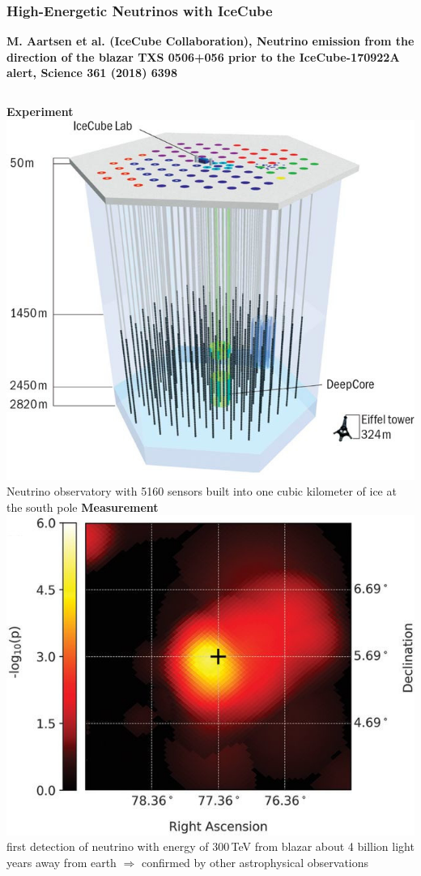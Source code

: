 \documentclass[10pt,t]{beamer}
\begin{document}
\begin{frame}
\frametitle{High-Energetic Neutrinos with IceCube}
\vspace*{-2.6\baselineskip}
\alert{\bfseries\footnotesize M. Aartsen et al. (IceCube Collaboration), Neutrino emission from the direction of the blazar TXS 0506+056 prior to the IceCube-170922A alert, Science 361 (2018) 6398}
\vspace*{\baselineskip}
\begin{columns}
\textbf{Experiment} \\[1ex]
    \includegraphics[width=\textwidth]{icecube-experiment} \\
    Neutrino observatory with 5160 sensors built into one cubic kilometer of ice at the south pole
\textbf{Measurement} \\[1ex]
    \includegraphics[width=\textwidth]{icecube-ergebnis} \\
    first detection of neutrino with energy of 300\,TeV from blazar about 4 billion light years away from earth $\Rightarrow$ confirmed by other astrophysical observations
\end{columns}
\vspace*{-8pt}
\end{frame}
\end{document}
